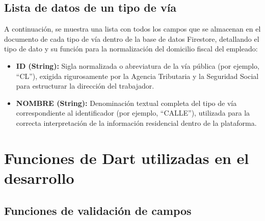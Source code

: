 \subsection{Lista de datos de un tipo de vía}
A continuación, se muestra una lista con todos los campos que se almacenan en el documento de cada tipo de vía dentro de la base de datos Firestore, detallando el tipo de dato y su función para la normalización del domicilio fiscal del empleado:
\begin{itemize}
    \item \textbf{ID (String):} Sigla normalizada o abreviatura de la vía pública (por ejemplo, ``CL''), exigida rigurosamente por la Agencia Tributaria y la Seguridad Social para estructurar la dirección del trabajador.
    \item \textbf{NOMBRE (String):} Denominación textual completa del tipo de vía correspondiente al identificador (por ejemplo, ``CALLE''), utilizada para la correcta interpretación de la información residencial dentro de la plataforma.
\end{itemize}





\section{Funciones de Dart utilizadas en el desarrollo}

\subsection{Funciones de validación de campos}
